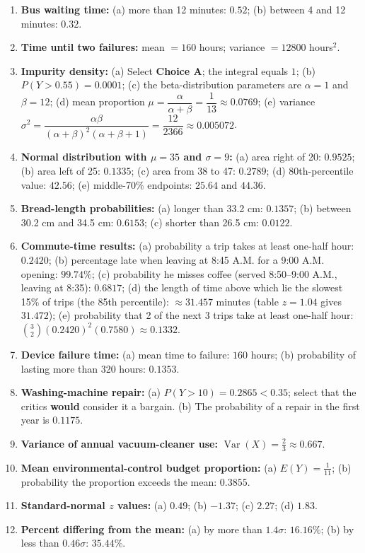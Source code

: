 \documentclass[11pt]{article}
\begin{document}
\begin{enumerate}[leftmargin=*,label=\textbf{\arabic*.}]
\item \textbf{Bus waiting time:}
(a) more than 12 minutes: $0.52$;
(b) between 4 and 12 minutes: $0.32$.

\item \textbf{Time until two failures:}
mean $=160$ hours; variance $=12800$ hours$^2$.

\item \textbf{Impurity density:}
(a) Select \textbf{Choice A}; the integral equals $1$;
(b) $P(Y>0.55)=0.0001$;
(c) the beta-distribution parameters are $\alpha=1$ and $\beta=12$;
(d) mean proportion $\mu=\dfrac{\alpha}{\alpha+\beta}=\dfrac1{13}\approx0.0769$;
(e) variance $\sigma^2=\dfrac{\alpha\beta}{(\alpha+\beta)^2(\alpha+\beta+1)}
=\dfrac{12}{2366}\approx0.005072$.

\item \textbf{Normal distribution with $\mu=35$ and $\sigma=9$:}
(a) area right of 20: $0.9525$;
(b) area left of 25: $0.1335$;
(c) area from 38 to 47: $0.2789$;
(d) 80th-percentile value: $42.56$;
(e) middle-70\% endpoints: $25.64$ and $44.36$.

\item \textbf{Bread-length probabilities:}
(a) longer than 33.2 cm: $0.1357$;
(b) between 30.2 cm and 34.5 cm: $0.6153$;
(c) shorter than 26.5 cm: $0.0122$.

\item \textbf{Commute-time results:}
(a) probability a trip takes at least one-half hour: $0.2420$;
(b) percentage late when leaving at 8:45 A.M. for a 9:00 A.M. opening:
$99.74\%$;
(c) probability he misses coffee (served 8:50--9:00 A.M., leaving at 8:35):
$0.6817$;
(d) the length of time above which lie the slowest 15\% of trips (the 85th
percentile): $\approx 31.457$ minutes (table $z=1.04$ gives $31.472$);
(e) probability that 2 of the next 3 trips take at least one-half hour:
$\binom{3}{2}(0.2420)^2(0.7580)\approx0.1332$.

\item \textbf{Device failure time:}
(a) mean time to failure: $160$ hours;
(b) probability of lasting more than 320 hours: $0.1353$.

\item \textbf{Washing-machine repair:}
(a) $P(Y>10)=0.2865<0.35$; select that the critics \textbf{would} consider it
a bargain.
(b) The probability of a repair in the first year is $0.1175$.

\item \textbf{Variance of annual vacuum-cleaner use:}
$\displaystyle \operatorname{Var}(X)=\frac23\approx0.667$.

\item \textbf{Mean environmental-control budget proportion:}
(a) $\displaystyle E(Y)=\frac1{11}$;
(b) probability the proportion exceeds the mean: $0.3855$.

\item \textbf{Standard-normal $z$ values:}
(a) $0.49$;
(b) $-1.37$;
(c) $2.27$;
(d) $1.83$.

\item \textbf{Percent differing from the mean:}
(a) by more than $1.4\sigma$: $16.16\%$;
(b) by less than $0.46\sigma$: $35.44\%$.
\end{enumerate}
\end{document}
